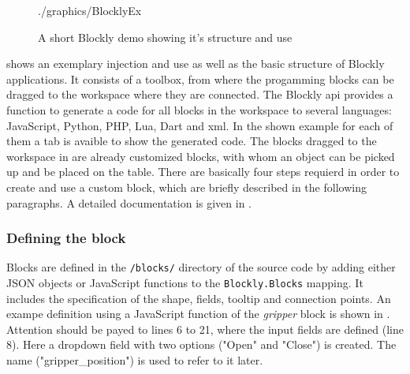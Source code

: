 \begin{figure}[htbp]
	\centering
	\begin{overpic}[width=0.9\linewidth]{./graphics/BlocklyEx}
	\end{overpic}
	\caption{A short Blockly demo showing it's structure and use}%
	\label{fig:BlocklyEx}%
\end{figure}

 shows an exemplary injection and use as well as the basic structure of Blockly applications. It consists of a toolbox, from where the progamming blocks can be dragged to the workspace where they are connected. The Blockly \gls{api} \cite{BlocklyAPI} provides a function to generate a code for all blocks in the workspace to several languages: JavaScript, Python, PHP, Lua, Dart and \gls{xml}. In the shown example for each of them a tab is avaible to show the generated code. The blocks dragged to the workspace in  are already customized blocks, with whom an object can be picked up and be placed on the table. There are basically four steps requierd in order to create and use a custom block, which are briefly described in the following paragraphs. A detailed documentation is given in \cite{BlocklyCustomBlocks}.

\subsubsection{Defining the block}
Blocks are defined in the \lstinline!/blocks/! directory of the source code by adding either JSON objects or JavaScript functions to the \lstinline!Blockly.Blocks! mapping. It includes the specification of the shape, fields, tooltip and connection points. An exampe definition using a JavaScript function of the \textit{gripper} block is shown in . Attention should be payed to lines 6 to 21, where the input fields are defined (line 8). Here a dropdown field with two options ("Open" and "Close") is created. The name ("gripper\_position") is used to refer to it later.

\begin{figure}[htbp]
	
\end{figure}

